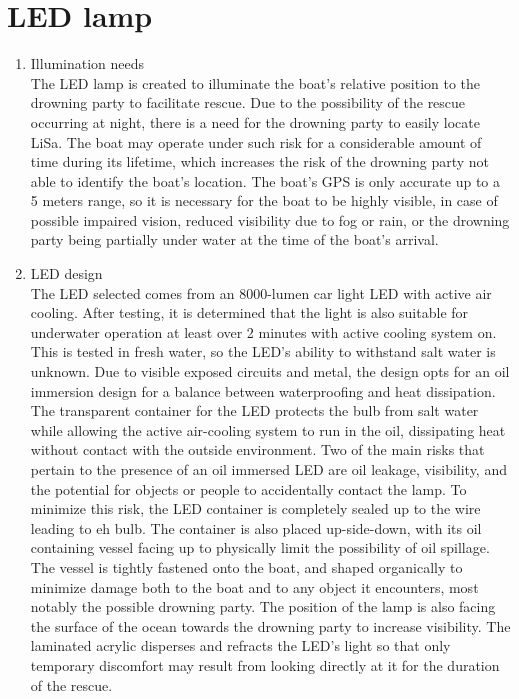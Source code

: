 \documentclass{article}[10pt]
\begin{document}
\section{LED lamp}
\begin{enumerate}
    \item Illumination needs\\
The LED lamp is created to illuminate the boat’s relative position to the drowning party to facilitate rescue. Due to the possibility of the rescue occurring at night, there is a need for the drowning party to easily locate LiSa. The boat may operate under such risk for a considerable amount of time during its lifetime, which increases the risk of the drowning party not able to identify the boat’s location. The boat’s GPS is only accurate up to a 5 meters range, so it is necessary for the boat to be highly visible, in case of possible impaired vision, reduced visibility due to fog or rain, or the drowning party being partially under water at the time of the boat’s arrival.
\item LED design\\
The LED selected comes from an 8000-lumen car light LED with active air cooling. After testing, it is determined that the light is also suitable for underwater operation at least over 2 minutes with active cooling system on. This is tested in fresh water, so the LED’s ability to withstand salt water is unknown. Due to visible exposed circuits and metal, the design opts for an oil immersion design for a balance between waterproofing and heat dissipation. The transparent container for the LED protects the bulb from salt water while allowing the active air-cooling system to run in the oil, dissipating heat without contact with the outside environment.
 Two of the main risks that pertain to the presence of an oil immersed LED are oil leakage, visibility, and the potential for objects or people to accidentally contact the lamp. To minimize this risk, the LED container is completely sealed up to the wire leading to eh bulb. The container is also placed up-side-down, with its oil containing vessel facing up to physically limit the possibility of oil spillage. The vessel is tightly fastened onto the boat, and shaped organically to minimize damage both to the boat and to any object it encounters, most notably the possible drowning party. The position of the lamp is also facing the surface of the ocean towards the drowning party to increase visibility. The laminated acrylic disperses and refracts the LED’s light so that only temporary discomfort may result from looking directly at it for the duration of the rescue. 
\end{enumerate}
\end{document}
